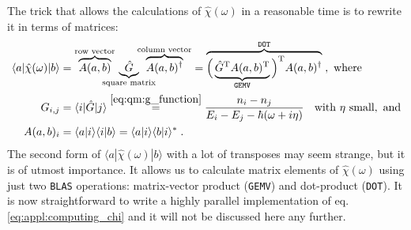 \documentclass[a4paper,12pt]{article}
\begin{document}
    The trick that allows the calculations of $\hat\chi(\omega)$ in a reasonable time is to rewrite it in terms of matrices:
    \begin{equation} \label{eq:appl:computing_chi}
    \begin{aligned}
        \langle a | \hat\chi(\omega) | b \rangle 
            &= \overbrace{A(a,b)}^\text{row vector}\!\!\!\!\!\!\!\! \underbrace{\hat G}_\text{square matrix}\!\!\!\!\!\!\!\!\!\!\! \overbrace{A(a,b)^\dagger}^\text{column vector}
            = \overbrace{\Big( \underbrace{{\hat G}^\text{T} A(a,b)^\text{T}}_\text{\texttt{GEMV}} \Big)^\text{T} A(a,b)^\dagger}^\text{\texttt{DOT}} \; ,\text{ where} \\
        G_{i,j} &= \langle i | \hat G | j \rangle \overset{\eqref{eq:qm:g_function}}{=} \frac{n_i - n_j}{E_i - E_j - \hbar(\omega + i\eta)} \; \text{\ \ with }\eta\text{ small}, \text{ and}\\
        A(a,b)_i &= \langle a | i \rangle \langle i | b \rangle = \langle a | i \rangle \langle b | i \rangle^* \; .
    \end{aligned}
    \end{equation}
    The second form of $\langle a | \hat \chi(\omega) | b \rangle$ with a lot of transposes may seem strange, but it is of utmost importance. It allows us to calculate matrix elements of $\hat \chi(\omega)$ using just two \texttt{BLAS} operations: matrix-vector product (\texttt{GEMV}) and dot-product (\texttt{DOT}). It is now straightforward to write a highly parallel implementation of eq. \eqref{eq:appl:computing_chi} and it will not be discussed here any further.
\end{document}
